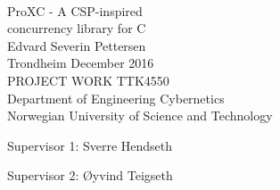 
\thispagestyle{empty}

\mbox{}\\[6pc]
\begin{center}
\Huge{ProXC - A CSP-inspired\\ concurrency library for C}\\[2pc]

\Large{Edvard Severin Pettersen}\\[1pc]
\large{Trondheim December 2016}\\[2pc]

PROJECT WORK TTK4550\\
Department of Engineering Cybernetics\\
Norwegian University of Science and Technology
\end{center}
\vfill

\noindent Supervisor 1: Sverre Hendseth

\noindent Supervisor 2: Øyvind Teigseth

\afterpage{\blankpage}

